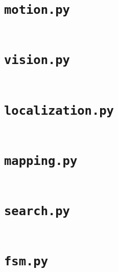 \documentclass[11pt,letterpaper]{article}
\begin{document}
\section{\texttt{motion.py}}
\inputminted{python}{fp/motion.py}

\section{\texttt{vision.py}}
\inputminted{python}{fp/vision.py}

\section{\texttt{localization.py}}
\inputminted{python}{fp/localization.py}

\section{\texttt{mapping.py}}
\inputminted{python}{fp/mapping.py}

\section{\texttt{search.py}}
\inputminted{python}{fp/search.py}

\section{\texttt{fsm.py}}
\inputminted{python}{fp/fsm.py}
\end{document}
